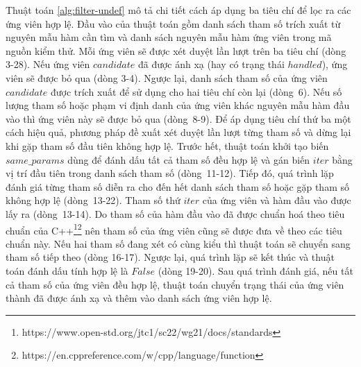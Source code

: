 Thuật toán \autoref{alg:filter-undef} mô tả chi tiết cách áp dụng ba tiêu chí để lọc ra các ứng viên hợp lệ. Đầu vào của thuật toán gồm danh sách tham số trích xuất từ nguyên mẫu hàm cần tìm và danh sách nguyên mẫu hàm ứng viên trong mã nguồn kiểm thử. Mỗi ứng viên sẽ được xét duyệt lần lượt trên ba tiêu chí (dòng 3-28). Nếu ứng viên $candidate$ đã được ánh xạ (hay có trạng thái $handled$), ứng viên sẽ được bỏ qua (dòng 3-4). Ngược lại, danh sách tham số của ứng viên $candidate$ được trích xuất để sử dụng cho hai tiêu chí còn lại (dòng~6). Nếu số lượng tham số hoặc phạm vi định danh của ứng viên khác nguyên mẫu hàm đầu vào thì ứng viên này sẽ được bỏ qua (dòng~8-9). Để áp dụng tiêu chí thứ ba một cách hiệu quả, phương pháp đề xuất xét duyệt lần lượt từng tham số và dừng lại khi gặp tham số đầu tiên không hợp lệ. Trước hết, thuật toán khởi tạo biến $same\_params$ dùng để đánh dấu tất cả tham số đều hợp lệ và gán biến $iter$ bằng vị trí đầu tiên trong danh sách tham số (dòng~11-12). Tiếp đó, quá trình lặp đánh giá từng tham số diễn ra cho đến hết danh sách tham số hoặc gặp tham số không hợp lệ (dòng~13-22). Tham số thứ $iter$ của ứng viên và hàm đầu vào được lấy ra (dòng~13-14). Do tham số của hàm đầu vào đã được chuẩn hoá theo tiêu chuẩn của C++\footnote{https://www.open-std.org/jtc1/sc22/wg21/docs/standards}\footnote{https://en.cppreference.com/w/cpp/language/function} nên tham số của ứng viên cũng sẽ được đưa về theo các tiêu chuẩn này. Nếu hai tham số đang xét có cùng kiểu thì thuật toán sẽ chuyển sang tham số tiếp theo (dòng 16-17). Ngược lại, quá trình lặp sẽ kết thúc và thuật toán đánh dấu tính hợp lệ là $False$ (dòng 19-20). Sau quá trình đánh giá, nếu tất cả tham số của ứng viên đều hợp lệ, thuật toán chuyển trạng thái của ứng viên thành đã được ánh xạ và thêm vào danh sách ứng viên hợp lệ.